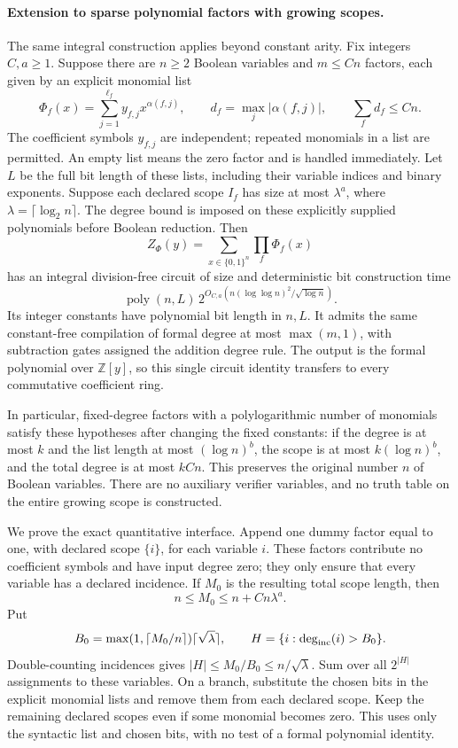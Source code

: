 \paragraph{Extension to sparse polynomial factors with growing scopes.}
The same integral construction applies beyond constant arity.
Fix integers $C,a\ge1$.  Suppose there are $n\ge2$ Boolean variables
and $m\le Cn$ factors, each given by an explicit monomial list
\[
 \Phi_f(x)=\sum_{j=1}^{\ell_f}y_{f,j}x^{\alpha(f,j)},
 \qquad d_f=\max_j|\alpha(f,j)|,
 \qquad \sum_f d_f\le Cn.
\]
The coefficient symbols $y_{f,j}$ are independent; repeated
monomials in a list are permitted.  An empty list means the zero
factor and is handled immediately.  Let $L$ be the full bit length
of these lists, including their variable indices and binary
exponents.  Suppose each declared scope $I_f$ has size at most
$\lambda^a$, where $\lambda=\lceil\log_2 n\rceil$.
The degree bound is imposed on these explicitly supplied
polynomials before Boolean reduction.  Then
\[
 Z_{\Phi}(y)=\sum_{x\in\{0,1\}^n}\prod_f\Phi_f(x)
\]
has an integral division-free circuit of size and deterministic
bit construction time
\[
 \operatorname{poly}(n,L)\,
 2^{O_{C,a}(n(\log\log n)^2/\sqrt{\log n})}.
\]
Its integer constants have polynomial bit length in $n,L$.
It admits the same constant-free compilation of formal degree
at most $\max(m,1)$, with subtraction gates assigned the
addition degree rule.  The output is the formal polynomial
over $\mathbb Z[y]$, so this single circuit identity transfers
to every commutative coefficient ring.

In particular, fixed-degree factors with a polylogarithmic
number of monomials satisfy these hypotheses after changing
the fixed constants: if the degree is at most $k$ and the
list length at most $(\log n)^b$, the scope is at most
$k(\log n)^b$, and the total degree is at most $kCn$.
This preserves the original number $n$ of Boolean variables.
There are no auxiliary verifier variables, and no truth table
on the entire growing scope is constructed.

We prove the exact quantitative interface.  Append one
dummy factor equal to one, with declared scope $\{i\}$, for
each variable $i$.  These factors contribute no coefficient
symbols and have input degree zero; they only ensure that
every variable has a declared incidence.  If $M_0$ is the
resulting total scope length, then
\[
              n\le M_0\le n+Cn\lambda^a.
\]
Put
\[
 B_0=\max(1,\lceil M_0/n\rceil)\lceil\sqrt\lambda\rceil,
 \qquad H=\{i:\deg_{\rm inc}(i)>B_0\}.
\]
Double-counting incidences gives
$|H|\le M_0/B_0\le n/\sqrt\lambda$.
Sum over all $2^{|H|}$ assignments to these variables.  On a
branch, substitute the chosen bits in the explicit monomial
lists and remove them from each declared scope.  Keep the
remaining declared scopes even if some monomial becomes
zero.  This uses only the syntactic list and chosen bits,
with no test of a formal polynomial identity.

